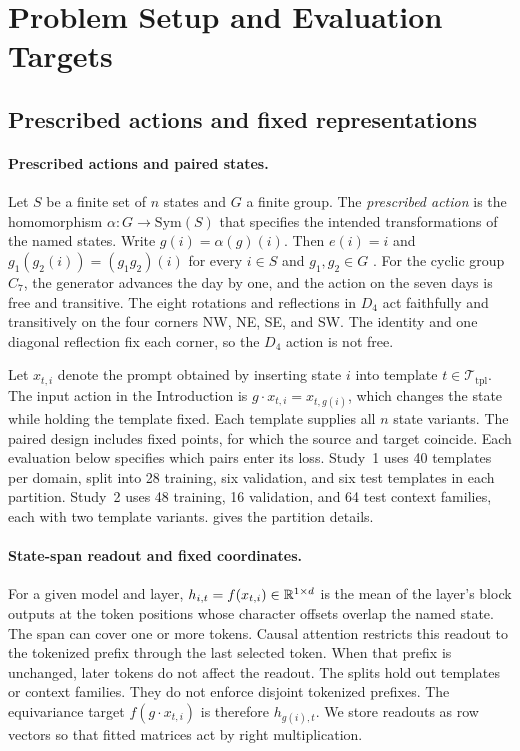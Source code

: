 \section{Problem Setup and Evaluation Targets}
\label{sec:setup}
\subsection{Prescribed actions and fixed representations}

\paragraph{Prescribed actions and paired states.}
Let $S$ be a finite set of $n$ states and $G$ a finite group.
The \emph{prescribed action} is the homomorphism $\alpha:G\to\mathrm{Sym}(S)$ that specifies the intended transformations of the named states.
Write $g(i)=\alpha(g)(i)$. Then $e(i)=i$ and $g_1(g_2(i))=(g_1g_2)(i)$ for every $i\in S$ and $g_1,g_2\in G$ \citep{serre1977linear}.
For the cyclic group $C_7$, the generator advances the day by one, and the action on the seven days is free and transitive.
The eight rotations and reflections in $D_4$ act faithfully and transitively on the four corners NW, NE, SE, and SW.
The identity and one diagonal reflection fix each corner, so the $D_4$ action is not free.

Let $x_{t,i}$ denote the prompt obtained by inserting state $i$ into template $t\in\mathcal T_{\mathrm{tpl}}$.
The input action in the Introduction is $g\cdot x_{t,i}=x_{t,g(i)}$, which changes the state while holding the template fixed.
Each template supplies all $n$ state variants.
The paired design includes fixed points, for which the source and target coincide. Each evaluation below specifies which pairs enter its loss.
Study~1 uses 40 templates per domain, split into 28 training, six validation, and six test templates in each partition.
Study~2 uses 48 training, 16 validation, and 64 test context families, each with two template variants.
 gives the partition details.

\paragraph{State-span readout and fixed coordinates.}
For a given model and layer, $h_{i,t}=f(x_{t,i})\in\mathbb{R}^{1\times d}$ is the mean of the layer's block outputs at the token positions whose character offsets overlap the named state. The span can cover one or more tokens.
Causal attention restricts this readout to the tokenized prefix through the last selected token. When that prefix is unchanged, later tokens do not affect the readout.
The splits hold out templates or context families. They do not enforce disjoint tokenized prefixes.
The equivariance target $f(g\cdot x_{t,i})$ is therefore $h_{g(i),t}$.
We store readouts as row vectors so that fitted matrices act by right multiplication.

